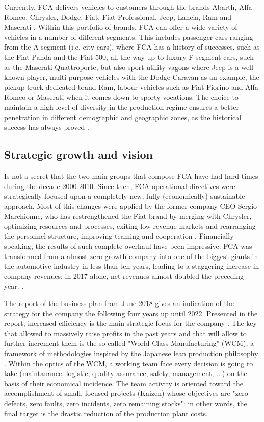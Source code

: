 Currently, FCA delivers vehicles to customers through the brands Abarth, Alfa Romeo, Chrysler, Dodge, Fiat, Fiat Professional, Jeep, Lancia, Ram and Maserati \cite{fca_overview}. Within this portfolio of brands, FCA can offer a wide variety of vehicles in a number of different segments. This includes passenger cars ranging from the A-segment (i.e. city cars), where FCA has a history of successes, such as the Fiat Panda and the Fiat 500, all the way up to luxury F-segment cars, such as the Maserati Quattroporte, but also sport utility vagons where Jeep is a well known player, multi-purpose vehicles with the Dodge Caravan as an example, the pickup-truck dedicated brand Ram, labour vehicles such as Fiat Fiorino and Alfa Romeo or Maserati when it comes down to sporty vocations.
The choice to maintain a high level of diversity in the production regime ensures a better penetration in different demographic and geographic zones, as the historical success has always proved \cite{fca_marketing_strategy}.


\subsection{Strategic growth and vision}
Is not a secret that the two main groups that compose FCA have had hard times during the decade 2000-2010.
Since then, FCA operational directives were strategically focused upon a completely new, fully (economically) sustainable approach. Most of this changes were applied by the former company CEO Sergio Marchionne, who has restrengthened the Fiat brand by merging with Chrysler, optimizing resources and processes, exiting low-revenue markets and rearranging the personnel structure, improving teaming and cooperation \cite{fca_marketing_strategy}. Financially speaking, the results of such complete overhaul have been impressive: FCA was transformed from a almost zero growth company into one of the biggest giants in the automotive industry in less than ten years, leading to a staggering increase in company revenues: in 2017 alone, net revenues almost doubled the preceding year. \cite{fca_marchionne_fortune}\cite{statista_fca_net_revenues}.

The report of the business plan from June 2018 gives an indication of the strategy for the company the following four years up until 2022. Presented in the report, increased efficiency is the main strategic focus for the company \cite{fca_financial_overview}. The key that allowed to massively raise profits in the past years and that will allow to further increment them is the so called "World Class Manufacturing" (WCM), a framework of methodologies inspired by the Japanese lean production philosophy \cite{fca_wcm}. Within the optics of the WCM, a working team face every decision is going to take (maintanance, logistic, quality assurance, safety, management, ...) on the basis of their economical incidence. The team activity is oriented toward the accomplishment of small, focused projects (Kaizen) whose objectives are "zero defects, zero faults, zero incidents, zero remaining stocks": in other words, the final target is the drastic reduction of the production plant costs.

